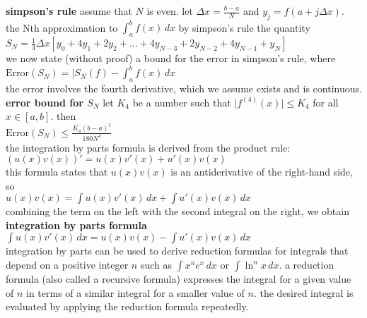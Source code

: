 \documentclass{article}
\begin{document}
\textbf{simpson's rule} assume that $N$ is even. let $\Delta x = \frac{b - a}{N}$ and $y_j = f(a + j\Delta x)$.\\
the Nth approximation to $\int_{a}^{b}f(x)\,dx$ by simpson's rule the quantity\\
$S_N = \frac{1}{3}\Delta x[y_0 + 4y_1 + 2y_2 + \ldots + 4y_{N-3} + 2y_{N-2} + 4y_{N-1} + y_N]$\\

we now state (without proof) a bound for the error in simpson's rule, where\\
$\text{Error}(S_N) = \lvert S_N(f) - \int_{a}^{b}f(x)\,dx$\\
the error involves the fourth derivative, which we assume exists and is continuous.\\

\textbf{error bound for $S_N$} let $K_4$ be a number such that $\lvert f^{(4)}(x)\rvert \leq K_4$ for all $x \in [a, b]$. then\\
$\text{Error}(S_N) \leq \frac{K_4(b - a)^5}{180N^4}$\\

the integration by parts formula is derived from the product rule:\\
$(u(x)v(x))' = u(x)v'(x) + u'(x)v(x)$\\
this formula states that $u(x)v(x)$ is an antiderivative of the right-hand side, so\\
$u(x)v(x) = \int u(x)v'(x)\,dx + \int u'(x)v(x)\,dx$\\
combining the term on the left with the second integral on the right, we obtain\\

\textbf{integration by parts formula}\\
$\int u(x)v'(x)\,dx = u(x)v(x) - \int u'(x)v(x)\,dx$\\

integration by parts can be used to derive reduction formulas for integrals that depend on a positive integer $n$ such as $\int x^ne^x\,dx$ or $\int \ln^n x\,dx$. a reduction formula (also called a recursive formula) expresses the integral for a given value of $n$ in terms of a similar integral for a smaller value of $n$. the desired integral is evaluated by applying the reduction formula repeatedly.\\
\end{document}
